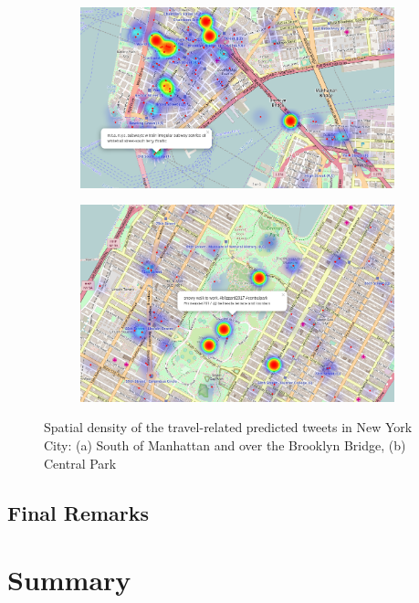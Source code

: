 \begin{figure}[htbp]
	\centering
	\begin{subfigure}[htbp]{0.8\textwidth}
		\centering
		\includegraphics[width=0.9\columnwidth]{figures/nyc_map.png}
		\caption{}
		\label{fig:brooklyn}
	\end{subfigure}
	
	\medskip
	
	\centering
	\begin{subfigure}[htbp]{0.8\textwidth}
		\centering
		\includegraphics[width=0.9\columnwidth]{figures/nyc_map2.png}
		\caption{}
		\label{fig:central_park}
	\end{subfigure}
	
	\caption[Spatial density of the predicted tweets]{Spatial density of the travel-related predicted tweets in New York City: (a) South of Manhattan and over the Brooklyn Bridge, (b) Central Park}
	\label{fig:nyc_london_melbourne_geographical_distribution}
\end{figure}

\subsection{Final Remarks}

\section{Summary}
